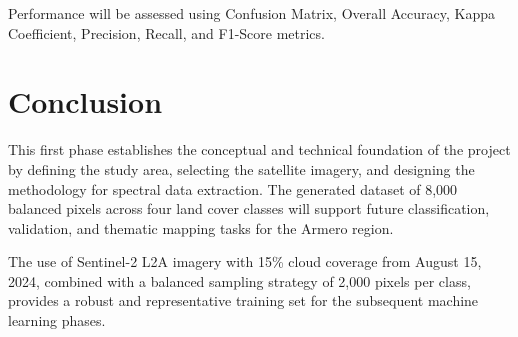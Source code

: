 \documentclass[12pt,a4paper]{article}
\begin{document}
Performance will be assessed using Confusion Matrix, Overall Accuracy, Kappa Coefficient, Precision, Recall, and F1-Score metrics.

\section{Conclusion}

This first phase establishes the conceptual and technical foundation of the project by defining the study area, selecting the satellite imagery, and designing the methodology for spectral data extraction. The generated dataset of 8,000 balanced pixels across four land cover classes will support future classification, validation, and thematic mapping tasks for the Armero region.

The use of Sentinel-2 L2A imagery with 15\% cloud coverage from August 15, 2024, combined with a balanced sampling strategy of 2,000 pixels per class, provides a robust and representative training set for the subsequent machine learning phases.
\end{document}
